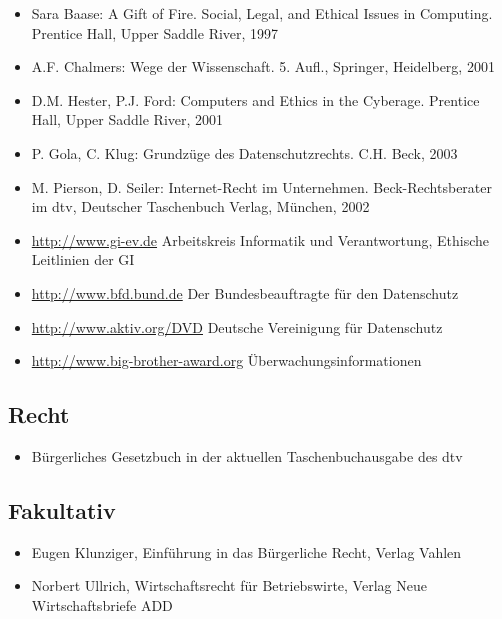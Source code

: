 \begin{itemize}
\tightlist
\item
  Sara Baase: A Gift of Fire. Social, Legal, and Ethical Issues in
  Computing. Prentice Hall, Upper Saddle River, 1997
\item
  A.F. Chalmers: Wege der Wissenschaft. 5. Aufl., Springer, Heidelberg,
  2001
\item
  D.M. Hester, P.J. Ford: Computers and Ethics in the Cyberage. Prentice
  Hall, Upper Saddle River, 2001
\item
  P. Gola, C. Klug: Grundzüge des Datenschutzrechts. C.H. Beck, 2003
\item
  M. Pierson, D. Seiler: Internet-Recht im Unternehmen.
  Beck-Rechtsberater im dtv, Deutscher Taschenbuch Verlag, München, 2002
\item
  \url{http://www.gi-ev.de} Arbeitskreis Informatik und Verantwortung,
  Ethische Leitlinien der GI
\item
  \url{http://www.bfd.bund.de} Der Bundesbeauftragte für den Datenschutz
\item
  \url{http://www.aktiv.org/DVD} Deutsche Vereinigung für Datenschutz
\item
  \url{http://www.big-brother-award.org} Überwachungsinformationen
\end{itemize}

\hypertarget{rechtpathlabelmi-2017modulbeschreibungen-bachelorba_mug-1}{%
\subsection*{Recht\label{/mi-2017/modulbeschreibungen-bachelor/BA_MUG}}\label{rechtpathlabelmi-2017modulbeschreibungen-bachelorba_mug-1}}

\begin{itemize}
\tightlist
\item
  Bürgerliches Gesetzbuch in der aktuellen Taschenbuchausgabe des dtv
\end{itemize}

\hypertarget{fakultativpathlabelmi-2017modulbeschreibungen-bachelorba_mug}{%
\subsection*{Fakultativ\label{/mi-2017/modulbeschreibungen-bachelor/BA_MUG}}\label{fakultativpathlabelmi-2017modulbeschreibungen-bachelorba_mug}}

\begin{itemize}
\tightlist
\item
  Eugen Klunziger, Einführung in das Bürgerliche Recht, Verlag Vahlen
\item
  Norbert Ullrich, Wirtschaftsrecht für Betriebswirte, Verlag Neue
  Wirtschaftsbriefe ADD
\end{itemize}

